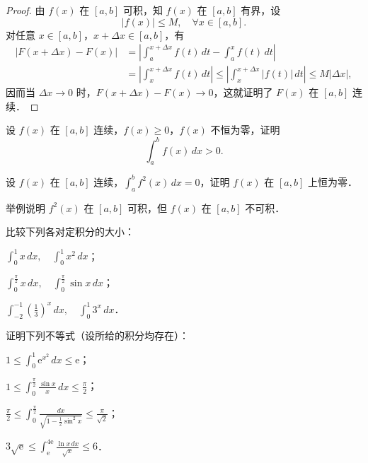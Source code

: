 \begin{proof}
由 $f(x)$ 在 $[a,b]$ 可积，知 $f(x)$ 在 $[a,b]$ 有界，设
\[
|f(x)| \leqslant M, \quad \forall x \in [a,b].
\]
对任意 $x \in [a,b]$，$x + \Delta x \in [a,b]$，有
\begin{align*}
|F(x + \Delta x) - F(x)| &= \left|\int_a^{x+\Delta x}f(t)\,dt - \int_a^x f(t)\,dt\right| \\
&= \left|\int_x^{x+\Delta x}f(t)\,dt\right| \leqslant \left|\int_x^{x+\Delta x}|f(t)|\,dt\right| \leqslant M|\Delta x|,
\end{align*}
因而当 $\Delta x \to 0$ 时，$F(x + \Delta x) - F(x) \to 0$，这就证明了 $F(x)$ 在 $[a,b]$ 连续．
\end{proof}

\begin{xiti}
\item 设 $f(x)$ 在 $[a,b]$ 连续，$f(x) \geqslant 0$，$f(x)$ 不恒为零，证明
\[
\int_a^b f(x)\,dx > 0.
\]

\item 设 $f(x)$ 在 $[a,b]$ 连续，$\int_a^b f^2(x)\,dx = 0$，证明 $f(x)$ 在 $[a,b]$ 上恒为零．

\item 举例说明 $f^2(x)$ 在 $[a,b]$ 可积，但 $f(x)$ 在 $[a,b]$ 不可积．

\item 比较下列各对定积分的大小：
\begin{ziti}
\item $\displaystyle \int_0^1 x \, dx, \quad \int_0^1 x^2 \, dx$；
\item $\displaystyle \int_0^{\frac{\pi}{2}} x \, dx, \quad \int_0^{\frac{\pi}{2}}\sin x \, dx$；
\item $\displaystyle \int_{-2}^{-1}\left(\frac{1}{3}\right)^x \, dx, \quad \int_0^1 3^x \, dx$．
\end{ziti}

\item 证明下列不等式（设所给的积分均存在）：
\begin{ziti}
\item $\displaystyle 1 \leqslant \int_0^1 \mathrm{e}^{x^2} \, dx \leqslant \mathrm{e}$；
\item $\displaystyle 1 \leqslant \int_0^{\frac{\pi}{2}} \frac{\sin x}{x} \, dx \leqslant \frac{\pi}{2}$；
\item $\displaystyle \frac{\pi}{2} \leqslant \int_0^{\frac{\pi}{2}} \frac{dx}{\sqrt{1 - \frac{1}{2}\sin^2 x}} \leqslant \frac{\pi}{\sqrt{2}}$；
\item $\displaystyle 3\sqrt{\mathrm{e}} \leqslant \int_{\mathrm{e}}^{4\mathrm{e}} \frac{\ln x \, dx}{\sqrt{x}} \leqslant 6$．
\end{ziti}


\end{xiti}
